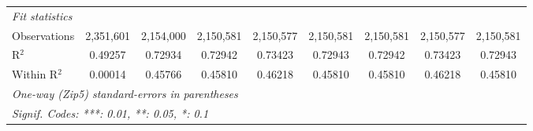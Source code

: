 \begin{table}[H]
{\begin{tabular}{lcccccccc}
 \midrule \emph{Fit statistics}&  & & & & & & & \\ 

 Observations & 2,351,601&2,154,000&2,150,581&2,150,577&2,150,581&2,150,581&2,150,577&2,150,581\\ 

 R$^2$ & 0.49257&0.72934&0.72942&0.73423&0.72943&0.72942&0.73423&0.72943\\ 

 Within R$^2$ & 0.00014&0.45766&0.45810&0.46218&0.45810&0.45810&0.46218&0.45810\\ 

 \midrule\midrule\multicolumn{9}{l}{\emph{One-way (Zip5) standard-errors in parentheses}}\\ 

 \multicolumn{9}{l}{\emph{Signif. Codes: ***: 0.01, **: 0.05, *: 0.1}}\\ 

 \end{tabular}} 

 \end{table} 

  

